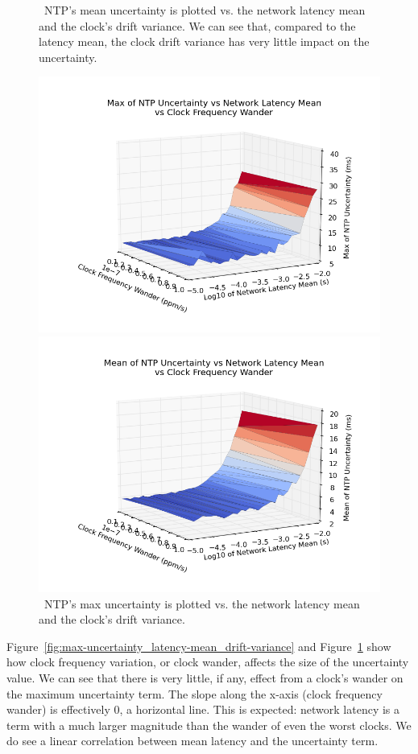 \begin{figure}[!htbp]
  \caption{~NTP's mean uncertainty is plotted vs. the network latency mean and the clock's drift variance. We can see that, compared to the latency mean, the clock drift variance has very little impact on the uncertainty.}
  \label{fig:max-uncertainty_latency-mean_drift-variance}
  \includegraphics[width=0.8\linewidth]{max_max_err-mean_latency-drift_variance.png}

  \caption{~NTP's max uncertainty is plotted vs. the network latency mean and the clock's drift variance.}
  \label{fig:mean-uncertainty_latency-mean_drift-variance}
  \includegraphics[width=0.8\linewidth]{mean_max_err-mean_latency-drift_variance.png}
\end{figure}

Figure~\ref{fig:max-uncertainty_latency-mean_drift-variance} and
Figure~\ref{fig:mean-uncertainty_latency-mean_drift-variance} show how
clock frequency variation, or clock wander, affects the size of the
uncertainty value.  We can see that there is very little, if any,
effect from a clock's wander on the maximum uncertainty term. The
slope along the x-axis (clock frequency wander) is effectively 0, a
horizontal line. This is expected: network latency is a term with a
much larger magnitude than the wander of even the worst clocks. We do
see a linear correlation between mean latency and the uncertainty term.

